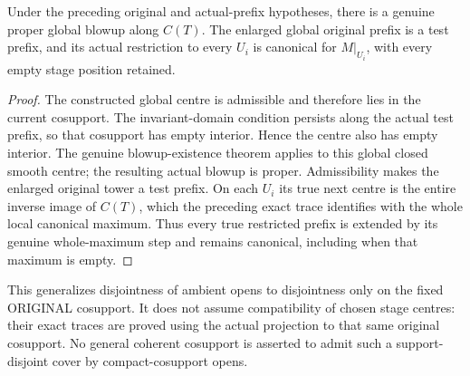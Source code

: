 \begin{theorem}
\label{hir:support-disjoint-canonical-global-refinement}
\leanok
Under the preceding original and actual-prefix hypotheses,
there is a genuine proper global blowup along $C(T)$.
The enlarged global original prefix is a test prefix, and
its actual restriction to every $U_i$ is canonical for
$M|_{U_i}$, with every empty stage position retained.
\end{theorem}
\begin{proof}
The constructed global centre is admissible and therefore
lies in the current cosupport. The invariant-domain condition
persists along the actual test prefix, so that cosupport
has empty interior. Hence the centre also has empty interior.
The genuine blowup-existence theorem applies to this global
closed smooth centre; the resulting actual blowup is proper.
Admissibility makes the enlarged original tower a test prefix.
On each $U_i$ its true next centre is the entire inverse image
of $C(T)$, which the preceding exact trace identifies with
the whole local canonical maximum. Thus every true restricted
prefix is extended by its genuine whole-maximum step and
remains canonical, including when that maximum is empty.
\end{proof}

\begin{remark}
This generalizes disjointness of ambient opens to disjointness
only on the fixed ORIGINAL cosupport. It does not assume
compatibility of chosen stage centres: their exact traces are
proved using the actual projection to that same original
cosupport. No general coherent cosupport is asserted to admit
such a support-disjoint cover by compact-cosupport opens.
\end{remark}
